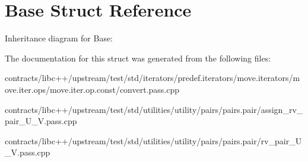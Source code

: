 \hypertarget{struct_base}{}\section{Base Struct Reference}
\label{struct_base}


Inheritance diagram for Base\+:


The documentation for this struct was generated from the following files\+:\begin{DoxyCompactItemize}
\item 
contracts/libc++/upstream/test/std/iterators/predef.\+iterators/move.\+iterators/move.\+iter.\+ops/move.\+iter.\+op.\+const/convert.\+pass.\+cpp\item 
contracts/libc++/upstream/test/std/utilities/utility/pairs/pairs.\+pair/assign\+\_\+rv\+\_\+pair\+\_\+\+U\+\_\+\+V.\+pass.\+cpp\item 
contracts/libc++/upstream/test/std/utilities/utility/pairs/pairs.\+pair/rv\+\_\+pair\+\_\+\+U\+\_\+\+V.\+pass.\+cpp\end{DoxyCompactItemize}
